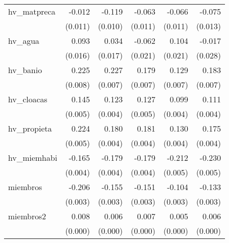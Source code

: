 {\begin{longtable}{l*{5}{D{.}{.}{-1}}}
\addlinespace
hv\_matpreca &      -0.012         &      -0.119\sym{***}&      -0.063\sym{***}&      -0.066\sym{***}&      -0.075\sym{***}\\
            &     (0.011)         &     (0.010)         &     (0.011)         &     (0.011)         &     (0.013)         \\
\addlinespace
hv\_agua     &       0.093\sym{***}&       0.034\sym{*}  &      -0.062\sym{**} &       0.104\sym{***}&      -0.017         \\
            &     (0.016)         &     (0.017)         &     (0.021)         &     (0.021)         &     (0.028)         \\
\addlinespace
hv\_banio    &       0.225\sym{***}&       0.227\sym{***}&       0.179\sym{***}&       0.129\sym{***}&       0.183\sym{***}\\
            &     (0.008)         &     (0.007)         &     (0.007)         &     (0.007)         &     (0.007)         \\
\addlinespace
hv\_cloacas  &       0.145\sym{***}&       0.123\sym{***}&       0.127\sym{***}&       0.099\sym{***}&       0.111\sym{***}\\
            &     (0.005)         &     (0.004)         &     (0.005)         &     (0.004)         &     (0.004)         \\
\addlinespace
hv\_propieta &       0.224\sym{***}&       0.180\sym{***}&       0.181\sym{***}&       0.130\sym{***}&       0.175\sym{***}\\
            &     (0.005)         &     (0.004)         &     (0.004)         &     (0.004)         &     (0.004)         \\
\addlinespace
hv\_miemhabi &      -0.165\sym{***}&      -0.179\sym{***}&      -0.179\sym{***}&      -0.212\sym{***}&      -0.230\sym{***}\\
            &     (0.004)         &     (0.004)         &     (0.004)         &     (0.005)         &     (0.005)         \\
\addlinespace
miembros    &      -0.206\sym{***}&      -0.155\sym{***}&      -0.151\sym{***}&      -0.104\sym{***}&      -0.133\sym{***}\\
            &     (0.003)         &     (0.003)         &     (0.003)         &     (0.003)         &     (0.003)         \\
\addlinespace
miembros2   &       0.008\sym{***}&       0.006\sym{***}&       0.007\sym{***}&       0.005\sym{***}&       0.006\sym{***}\\
            &     (0.000)         &     (0.000)         &     (0.000)         &     (0.000)         &     (0.000)         \\

\end{longtable}}
